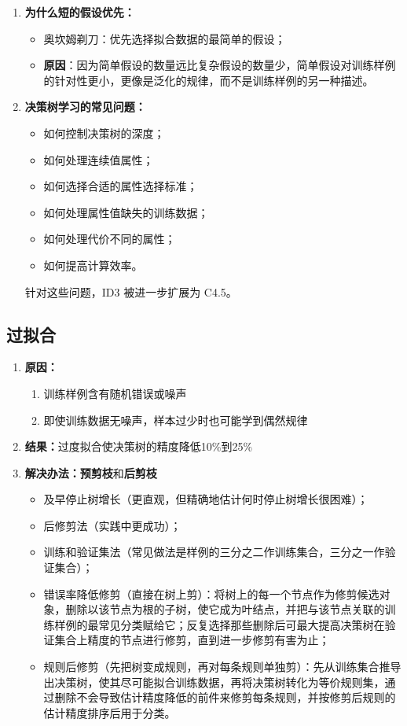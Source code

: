\documentclass[../main.tex]{subfiles}
\begin{document}
\begin{enumerate}
    \item \textbf{为什么短的假设优先：}
    \begin{itemize}
        \item 奥坎姆剃刀：优先选择拟合数据的最简单的假设；
        \item \textbf{原因}：因为简单假设的数量远比复杂假设的数量少，简单假设对训练样例的针对性更小，更像是泛化的规律，而不是训练样例的另一种描述。
    \end{itemize}

    \item \textbf{决策树学习的常见问题：}
    \begin{itemize}
        \item 如何控制决策树的深度；
        \item 如何处理连续值属性；
        \item 如何选择合适的属性选择标准；
        \item 如何处理属性值缺失的训练数据；
        \item 如何处理代价不同的属性；
        \item 如何提高计算效率。
    \end{itemize}
    针对这些问题，ID3 被进一步扩展为 C4.5。
\end{enumerate}
\subsection{过拟合}\label{sec:dt-overfitting}
\begin{enumerate}
    \item \textbf{原因：}
    \begin{enumerate}
        \item 训练样例含有随机错误或噪声
        \item 即使训练数据无噪声，样本过少时也可能学到偶然规律
    \end{enumerate}
    \item \textbf{结果：}过度拟合使决策树的精度降低10\%到25\%
    \item \textbf{解决办法：}\textbf{预剪枝}和\textbf{后剪枝}
    \begin{itemize}
        \item 及早停止树增长（更直观，但精确地估计何时停止树增长很困难）；
        \item 后修剪法（实践中更成功）；
        \item 训练和验证集法（常见做法是样例的三分之二作训练集合，三分之一作验证集合）；
        \item 错误率降低修剪（直接在树上剪）：将树上的每一个节点作为修剪候选对象，删除以该节点为根的子树，使它成为叶结点，并把与该节点关联的训练样例的最常见分类赋给它；反复选择那些删除后可最大提高决策树在验证集合上精度的节点进行修剪，直到进一步修剪有害为止；
        \item 规则后修剪（先把树变成规则，再对每条规则单独剪）：先从训练集合推导出决策树，使其尽可能拟合训练数据，再将决策树转化为等价规则集，通过删除不会导致估计精度降低的前件来修剪每条规则，并按修剪后规则的估计精度排序后用于分类。
    \end{itemize}
\end{enumerate}
\end{document}

